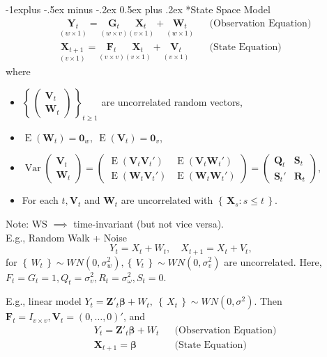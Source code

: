 \documentclass[paper=a4,fontsize=2.89mm]{scrartcl}
\makeatletter
\DeclareMathOperator{\Var}{Var}
\DeclareMathOperator{\E}{E}
\newcommand\set[1]{\left\{\, #1 \,\right\}}
\renewcommand{\subsection}{\@startsection{subsection}{2}{0mm}%
                                {-1explus -.5ex minus -.2ex}%
                                {0.5ex plus .2ex}%
                                {\normalfont\normalsize\bfseries}}
\makeatother
\begin{document}
\begin{multicols}{3}
\subsection*{State Space Model}
\begin{align*}
&\underset{(w\times1)}{\mathbf{Y}_t} = \underset{(w\times v)}{\mathbf{G}_t} \underset{(v\times1)}{\mathbf{X}_t} +  \underset{(w\times 1)}{\mathbf{W}_t} && \text{(Observation Equation)} \\
&\underset{(v\times1)}{\mathbf{X}_{t+1}} = \underset{(v\times v)}{\mathbf{F}_t} \underset{(v\times1)}{\mathbf{X}_t} +  \underset{(v\times 1)}{\mathbf{V}_t} && \text{(State Equation)}
\end{align*}
where
\begin{itemize}
\item $\set{\begin{pmatrix} \mathbf{V}_t \\ \mathbf{W}_t \end{pmatrix}}_{t\ge1}$ are uncorrelated random vectors, 
\item $\E(\mathbf{W}_t) = \mathbf{0}_w, ~ \E(\mathbf{V}_t) = \mathbf{0}_v$, 
\item $\Var\begin{pmatrix} \mathbf{V}_t \\ \mathbf{W}_t \end{pmatrix} = 
\begin{pmatrix} \E(\mathbf{V}_t\mathbf{V}_t') & \E(\mathbf{V}_t\mathbf{W}_t') \\ \E(\mathbf{W}_t\mathbf{V}_t') &  \E(\mathbf{W}_t\mathbf{W}_t') \end{pmatrix} = 
\begin{pmatrix} \mathbf{Q}_t & \mathbf{S}_t \\ \mathbf{S}_t' &  \mathbf{R}_t \end{pmatrix}$,
\item For each $t, \mathbf{V}_t$ and $\mathbf{W}_t$ are uncorrelated with $\set{\mathbf{X}_s: s\le t}$. 
\end{itemize}
Note: WS $\implies$ time-invariant (but not vice versa).\\
E.g.,
 Random Walk + Noise
$$Y_t = X_t + W_t, \quad X_{t+1} = X_t + V_t,$$
for $\set{W_t} \sim WN(0,\sigma^2_w), \set{V_t} \sim WN(0,\sigma^2_v)$ are uncorrelated. Here,
$F_t = G_t = 1, Q_t = \sigma^2_v, R_t = \sigma^2_\omega, S_t = 0$.

E.g., linear model $Y_t = \mathbf{Z}'_t \boldsymbol{\beta} + W_t, ~ \set{X_t} \sim WN(0,\sigma^2)$. Then
$\mathbf{F}_t = I_{v\times v}, \mathbf{V}_t = (0, \dots, 0)'$, and
\begin{align*}
&Y_t= \mathbf{Z}'_t \boldsymbol{\beta} + W_t && \text{(Observation Equation)} \\
& \mathbf{X}_{t+1} = \boldsymbol{\beta}&& \text{(State Equation)}
\end{align*}


\end{multicols}
\end{document}
